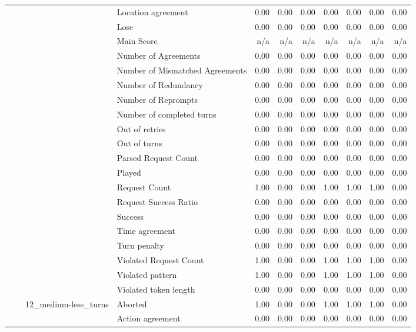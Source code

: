 \begin{tabular}{llllrrrrrrr}
 &  &  & Location agreement & 0.00 & 0.00 & 0.00 & 0.00 & 0.00 & 0.00 & 0.00 \\
 &  &  & Lose & 0.00 & 0.00 & 0.00 & 0.00 & 0.00 & 0.00 & 0.00 \\
 &  &  & Main Score & n/a & n/a & n/a & n/a & n/a & n/a & n/a \\
 &  &  & Number of Agreements & 0.00 & 0.00 & 0.00 & 0.00 & 0.00 & 0.00 & 0.00 \\
 &  &  & Number of Mismatched Agreements & 0.00 & 0.00 & 0.00 & 0.00 & 0.00 & 0.00 & 0.00 \\
 &  &  & Number of Redundancy & 0.00 & 0.00 & 0.00 & 0.00 & 0.00 & 0.00 & 0.00 \\
 &  &  & Number of Reprompts & 0.00 & 0.00 & 0.00 & 0.00 & 0.00 & 0.00 & 0.00 \\
 &  &  & Number of completed turns & 0.00 & 0.00 & 0.00 & 0.00 & 0.00 & 0.00 & 0.00 \\
 &  &  & Out of retries & 0.00 & 0.00 & 0.00 & 0.00 & 0.00 & 0.00 & 0.00 \\
 &  &  & Out of turns & 0.00 & 0.00 & 0.00 & 0.00 & 0.00 & 0.00 & 0.00 \\
 &  &  & Parsed Request Count & 0.00 & 0.00 & 0.00 & 0.00 & 0.00 & 0.00 & 0.00 \\
 &  &  & Played & 0.00 & 0.00 & 0.00 & 0.00 & 0.00 & 0.00 & 0.00 \\
 &  &  & Request Count & 1.00 & 0.00 & 0.00 & 1.00 & 1.00 & 1.00 & 0.00 \\
 &  &  & Request Success Ratio & 0.00 & 0.00 & 0.00 & 0.00 & 0.00 & 0.00 & 0.00 \\
 &  &  & Success & 0.00 & 0.00 & 0.00 & 0.00 & 0.00 & 0.00 & 0.00 \\
 &  &  & Time agreement & 0.00 & 0.00 & 0.00 & 0.00 & 0.00 & 0.00 & 0.00 \\
 &  &  & Turn penalty & 0.00 & 0.00 & 0.00 & 0.00 & 0.00 & 0.00 & 0.00 \\
 &  &  & Violated Request Count & 1.00 & 0.00 & 0.00 & 1.00 & 1.00 & 1.00 & 0.00 \\
 &  &  & Violated pattern & 1.00 & 0.00 & 0.00 & 1.00 & 1.00 & 1.00 & 0.00 \\
 &  &  & Violated token length & 0.00 & 0.00 & 0.00 & 0.00 & 0.00 & 0.00 & 0.00 \\
\cline{3-11}
 &  & \multirow[t]{27}{*}{12_medium-less_turns} & Aborted & 1.00 & 0.00 & 0.00 & 1.00 & 1.00 & 1.00 & 0.00 \\
 &  &  & Action agreement & 0.00 & 0.00 & 0.00 & 0.00 & 0.00 & 0.00 & 0.00 \\

\end{tabular}
